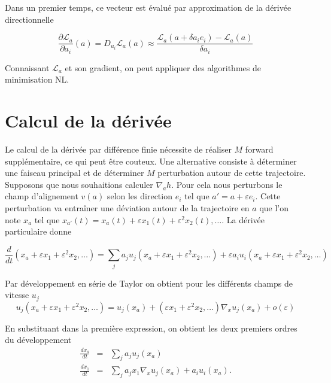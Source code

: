 \documentclass{article}
\begin{document}
Dans un premier temps, ce vecteur est évalué par approximation de la dérivée directionnelle

\begin{equation*}
    \frac{\partial \mathcal L_a}{\partial a_i}(a) = D_{u_i} \mathcal L_a(a) \approx \frac{\mathcal L_a(a + \delta a_i e_i) - \mathcal L_a(a)}{\delta a_i}
\end{equation*}

Connaissant $\mathcal L_a$ et son gradient, on peut appliquer des algorithmes de minimisation NL.

\section{Calcul de la dérivée}

Le calcul de la dérivée par différence finie nécessite de réaliser $M$ forward supplémentaire, ce qui peut être couteux. Une alternative consiste à déterminer une faiseau principal et de déterminer $M$ perturbation autour de cette trajectoire. Supposons que nous souhaitions calculer $\nabla_a h$. Pour cela nous perturbons le champ d'alignement $v(a)$ selon les direction $e_i$ tel que $a' = a + \varepsilon e_i$. Cette perturbation va entraîner une déviation autour de la trajectoire en $a$ que l'on note $x_a$ tel que $x_{a'}(t) = x_a(t) + \varepsilon x_1(t) + \varepsilon^2 x_2(t), \dots$.
La dérivée particulaire donne

\begin{equation*}
    \frac{d}{dt}(x_a + \varepsilon x_1 + \varepsilon^2 x_2, \dots) = \sum_j a_j u_j(x_a + \varepsilon x_1 + \varepsilon^2 x_2, \dots) + \varepsilon a_i u_i (x_a + \varepsilon x_1 + \varepsilon^2 x_2, \dots)
\end{equation*}

Par développement en série de Taylor on obtient pour les différents champs de vitesse $u_j$
\begin{equation*}
    u_j(x_a + \varepsilon x_1 + \varepsilon^2 x_2, \dots) = u_j(x_a) + (\varepsilon x_1 + \varepsilon^2 x_2, \dots) \nabla_x u_j (x_a) + o(\varepsilon)
\end{equation*}

En substituant dans la première expression, on obtient les deux premiers ordres du développement
\begin{eqnarray*}
    \frac{dx_a}{dt} &=&    \sum_j a_j u_j(x_a) \\
    \frac{dx_1}{dt} &=&   \sum_j a_j x_1 \nabla_x u_j(x_a) + a_i u_i(x_a).
\end{eqnarray*}
\end{document}
